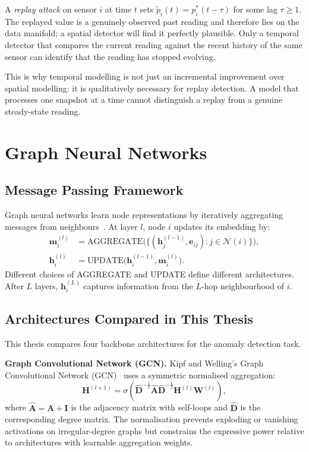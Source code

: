 A \emph{replay attack} on sensor $i$ at time $t$ sets
$\tilde{p}_i(t) = p_i^*(t - \tau)$ for some lag $\tau \geq 1$. The
replayed value is a genuinely observed past reading and therefore
lies on the data manifold; a spatial detector will find it perfectly
plausible. Only a temporal detector that compares the current reading
against the recent history of the same sensor can identify that the
reading has stopped evolving.

This is why temporal modelling is not just an incremental improvement
over spatial modelling: it is qualitatively necessary for replay
detection. A model that processes one snapshot at a time cannot
distinguish a replay from a genuine steady-state reading.

\section{Graph Neural Networks}
\label{sec:gnn_background}

\subsection{Message Passing Framework}

Graph neural networks learn node representations by iteratively
aggregating messages from neighbours~\cite{gilmer2017neural}. At
layer $l$, node $i$ updates its embedding by:
\begin{align}
  \mathbf{m}_i^{(l)} &= \text{AGGREGATE}\bigl(\{(\mathbf{h}_j^{(l-1)},
    \mathbf{e}_{ij}) : j \in \mathcal{N}(i)\}\bigr), \label{eq:aggregate} \\
  \mathbf{h}_i^{(l)} &= \text{UPDATE}\bigl(\mathbf{h}_i^{(l-1)},
    \mathbf{m}_i^{(l)}\bigr). \label{eq:update}
\end{align}
Different choices of AGGREGATE and UPDATE define different \gnn{}
architectures. After $L$ layers, $\mathbf{h}_i^{(L)}$ captures
information from the $L$-hop neighbourhood of $i$.

\subsection{Architectures Compared in This Thesis}

This thesis compares four backbone architectures for the \wdn{}
anomaly detection task.

\textbf{Graph Convolutional Network (GCN).} Kipf and Welling's
Graph Convolutional Network (GCN)~\cite{kipf2017semi} uses a symmetric normalised
aggregation:
\begin{equation}
  \mathbf{H}^{(l+1)} = \sigma\!\left(\hat{\mathbf{D}}^{-\frac{1}{2}}
    \hat{\mathbf{A}}\hat{\mathbf{D}}^{-\frac{1}{2}}
    \mathbf{H}^{(l)}\mathbf{W}^{(l)}\right),
\end{equation}
where $\hat{\mathbf{A}} = \mathbf{A} + \mathbf{I}$ is the adjacency
matrix with self-loops and $\hat{\mathbf{D}}$ is the corresponding
degree matrix. The normalisation prevents exploding or vanishing
activations on irregular-degree graphs but constrains the expressive
power relative to architectures with learnable aggregation weights.

